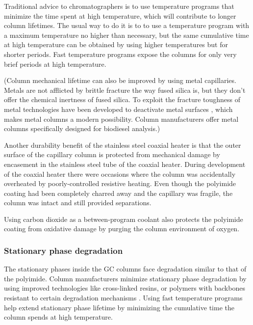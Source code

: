Traditional advice to chromatographers is to use temperature programs that
minimize the time spent at high temperature, which will contribute to longer
column lifetimes. The usual way to do it is to to use a temperature program with
a maximum temperature no higher than necessary, but the same cumulative time at
high temperature can be obtained by using higher temperatures but for shorter
periods. Fast temperature programs expose the columns for only very brief
periods at high temperature.

(Column mechanical lifetime can also be improved by using metal capillaries.
Metals are not afflicted by brittle fracture the way fused silica is, but they
don't offer the chemical inertness of fused silica. To exploit the fracture
toughness of metal technologies have been developed to deactivate metal surfaces
\autocite{Rohwer1986, Smith2002}, which makes metal columns a modern
possibility. Column manufacturers offer metal columns specifically designed for
biodiesel analysis.)

Another durability benefit of the stainless steel coaxial heater is that the
outer surface of the capillary column is protected from mechanical damage by
encasement in the stainless steel tube of the coaxial heater. During development
of the coaxial heater there were occasions where the column was accidentally
overheated by poorly-controlled resistive heating. Even though the polyimide
coating had been completely charred away and the capillary was fragile, the
column was intact and still provided separations.

Using carbon dioxide as a between-program coolant also protects the polyimide
coating from oxidative damage by purging the column environment of oxygen.

\subsubsection{Stationary phase degradation}

The stationary phases inside the GC columns face degradation similar to that
of the polyimide. Column manufacturers minimize sta\-tion\-ary phase degradation
by using improved technologies like cross-linked resins, or polymers with
backbones resistant to certain degradation mechanisms \autocite{Day2003}.
Using fast temperature programs help extend stationary phase lifetime by
minimizing the cumulative time the column spends at high temperature.

